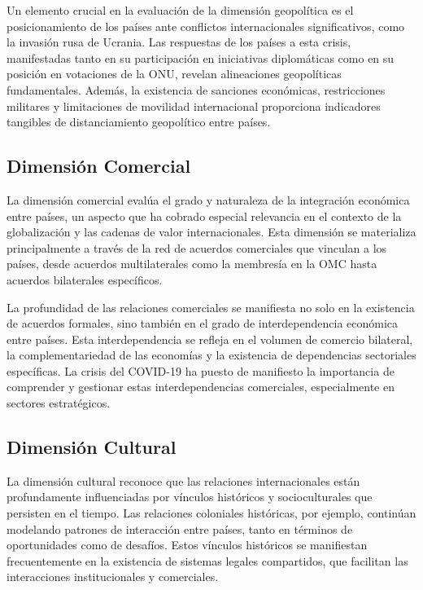 \documentclass[11pt,a4paper]{article}
\begin{document}
Un elemento crucial en la evaluación de la dimensión geopolítica es el posicionamiento de los países ante conflictos internacionales significativos, como la invasión rusa de Ucrania. Las respuestas de los países a esta crisis, manifestadas tanto en su participación en iniciativas diplomáticas como en su posición en votaciones de la ONU, revelan alineaciones geopolíticas fundamentales. Además, la existencia de sanciones económicas, restricciones militares y limitaciones de movilidad internacional proporciona indicadores tangibles de distanciamiento geopolítico entre países.

\subsection{Dimensión Comercial}

La dimensión comercial evalúa el grado y naturaleza de la integración económica entre países, un aspecto que ha cobrado especial relevancia en el contexto de la globalización y las cadenas de valor internacionales. Esta dimensión se materializa principalmente a través de la red de acuerdos comerciales que vinculan a los países, desde acuerdos multilaterales como la membresía en la OMC hasta acuerdos bilaterales específicos.

La profundidad de las relaciones comerciales se manifiesta no solo en la existencia de acuerdos formales, sino también en el grado de interdependencia económica entre países. Esta interdependencia se refleja en el volumen de comercio bilateral, la complementariedad de las economías y la existencia de dependencias sectoriales específicas. La crisis del COVID-19 ha puesto de manifiesto la importancia de comprender y gestionar estas interdependencias comerciales, especialmente en sectores estratégicos.

\subsection{Dimensión Cultural}

La dimensión cultural reconoce que las relaciones internacionales están profundamente influenciadas por vínculos históricos y socioculturales que persisten en el tiempo. Las relaciones coloniales históricas, por ejemplo, continúan modelando patrones de interacción entre países, tanto en términos de oportunidades como de desafíos. Estos vínculos históricos se manifiestan frecuentemente en la existencia de sistemas legales compartidos, que facilitan las interacciones institucionales y comerciales.
\end{document}
